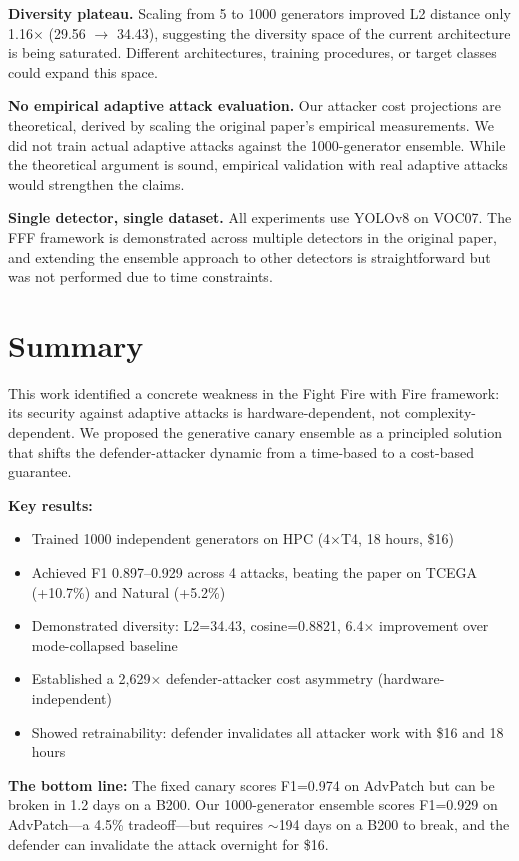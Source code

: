 \documentclass[11pt,a4paper]{article}
\begin{document}
\textbf{Diversity plateau.} Scaling from 5 to 1000 generators improved L2 distance only 1.16$\times$ (29.56 $\to$ 34.43), suggesting the diversity space of the current architecture is being saturated. Different architectures, training procedures, or target classes could expand this space.

\textbf{No empirical adaptive attack evaluation.} Our attacker cost projections are theoretical, derived by scaling the original paper's empirical measurements. We did not train actual adaptive attacks against the 1000-generator ensemble. While the theoretical argument is sound, empirical validation with real adaptive attacks would strengthen the claims.

\textbf{Single detector, single dataset.} All experiments use YOLOv8 on VOC07. The FFF framework is demonstrated across multiple detectors in the original paper, and extending the ensemble approach to other detectors is straightforward but was not performed due to time constraints.

\section{Summary}

This work identified a concrete weakness in the Fight Fire with Fire framework: its security against adaptive attacks is hardware-dependent, not complexity-dependent. We proposed the generative canary ensemble as a principled solution that shifts the defender-attacker dynamic from a time-based to a cost-based guarantee.

\vspace{0.3cm}

\noindent\textbf{Key results:}
\begin{itemize}[nosep]
    \item Trained 1000 independent generators on HPC (4$\times$T4, 18 hours, \$16)
    \item Achieved F1 0.897--0.929 across 4 attacks, beating the paper on TCEGA (+10.7\%) and Natural (+5.2\%)
    \item Demonstrated diversity: L2=34.43, cosine=0.8821, 6.4$\times$ improvement over mode-collapsed baseline
    \item Established a 2,629$\times$ defender-attacker cost asymmetry (hardware-independent)
    \item Showed retrainability: defender invalidates all attacker work with \$16 and 18 hours
\end{itemize}

\vspace{0.3cm}

\noindent\textbf{The bottom line:} The fixed canary scores F1=0.974 on AdvPatch but can be broken in 1.2 days on a B200. Our 1000-generator ensemble scores F1=0.929 on AdvPatch---a 4.5\% tradeoff---but requires $\sim$194 days on a B200 to break, and the defender can invalidate the attack overnight for \$16.
\end{document}
